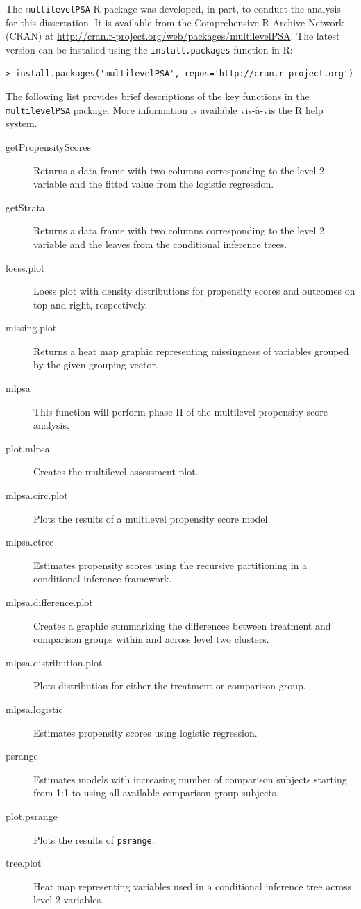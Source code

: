 \documentclass[letterpaper,12p,twoside]{article} %
\begin{document}
The \texttt{multilevelPSA} R package was developed, in part, to conduct the analysis for this dissertation. It is available from the Comprehensive R Archive Network (CRAN) at \url{http://cran.r-project.org/web/packages/multilevelPSA}. The latest version can be installed using the \texttt{install.packages} function in R:

\begin{verbatim}
> install.packages('multilevelPSA', repos='http://cran.r-project.org')
\end{verbatim}

The following list provides brief descriptions of the key functions in the \texttt{multilevelPSA} package. More information is available vis-\`a-vis the R help system.

\renewcommand{\descriptionlabel}[1]{\hspace{\labelsep}\textbf{\texttt{#1}}}
\begin{description}
\item[getPropensityScores] Returns a data frame with two columns corresponding to the level 2 variable and the fitted value from the logistic regression.
\item[getStrata] Returns a data frame with two columns corresponding to the level 2 variable and the leaves from the conditional inference trees.
\item[loess.plot] Loess plot with density distributions for propensity scores and outcomes on top and right, respectively.
\item[missing.plot] Returns a heat map graphic representing missingness of variables grouped by the given grouping vector.
\item[mlpsa] This function will perform phase II of the multilevel propensity score analysis.
\item[plot.mlpsa] Creates the multilevel assessment plot.
\item[mlpsa.circ.plot] Plots the results of a multilevel propensity score model.
\item[mlpsa.ctree] Estimates propensity scores using the recursive partitioning in a conditional inference framework.
\item[mlpsa.difference.plot] Creates a graphic summarizing the differences between treatment and comparison groups within and across level two clusters.
\item[mlpsa.distribution.plot] Plots distribution for either the treatment or comparison group.
\item[mlpsa.logistic] Estimates propensity scores using logistic regression.
\item[psrange] Estimates models with increasing number of comparison subjects starting from 1:1 to using all available comparison group subjects.
\item[plot.psrange] Plots the results of \texttt{psrange}.
\item[tree.plot] Heat map representing variables used in a conditional inference tree across level 2 variables.
\end{description}
\end{document}
